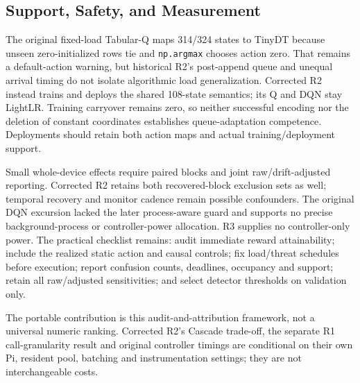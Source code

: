 \subsection{Support, Safety, and Measurement}
The original fixed-load Tabular-Q maps 314/324 states to TinyDT because unseen zero-initialized rows tie and \texttt{np.argmax} chooses action zero. That remains a default-action warning, but historical R2's post-append queue and unequal arrival timing do not isolate algorithmic load generalization. Corrected R2 instead trains and deploys the shared 108-state semantics; its Q and DQN stay LightLR. Training carryover remains zero, so neither successful encoding nor the deletion of constant coordinates establishes queue-adaptation competence. Deployments should retain both action maps and actual training/deployment support.

Small whole-device effects require paired blocks and joint raw/drift-adjusted reporting. Corrected R2 retains both recovered-block exclusion sets as well; temporal recovery and monitor cadence remain possible confounders. The original DQN excursion lacked the later process-aware guard and supports no precise background-process or controller-power allocation. R3 supplies no controller-only power. The practical checklist remains: audit immediate reward attainability; include the realized static action and causal controls; fix load/threat schedules before execution; report confusion counts, deadlines, occupancy and support; retain all raw/adjusted sensitivities; and select detector thresholds on validation only.

The portable contribution is this audit-and-attribution framework, not a universal numeric ranking. Corrected R2's Cascade trade-off, the separate R1 call-granularity result and original controller timings are conditional on their own Pi, resident pool, batching and instrumentation settings; they are not interchangeable costs.
